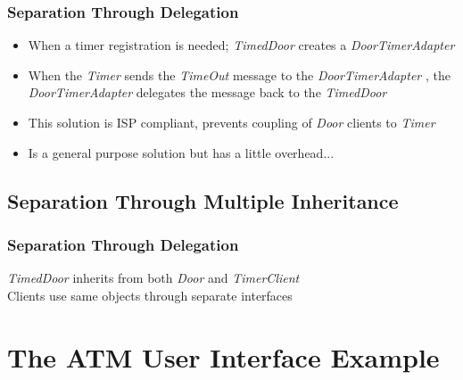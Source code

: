 \documentclass{beamer}
\begin{document}
\begin{frame}
  \frametitle{Separation Through Delegation}
  \begin{itemize}
	\item<+-> When a timer registration is needed; \textit{TimedDoor} creates a \textit{DoorTimerAdapter}
	\item<+-> When the \textit{Timer} sends the \textit{TimeOut} message to the \textit{DoorTimerAdapter} , the \textit{DoorTimerAdapter} delegates the message back to the \textit{TimedDoor}
	\item<+-> This solution is ISP compliant, prevents coupling of \textit{Door} clients to \textit{Timer}
	\item<+-> Is a general purpose solution but has a little overhead...
   \end{itemize}
\end{frame}

\subsection{Separation Through Multiple Inheritance}
\begin{frame}
  \frametitle{Separation Through Delegation}
  \textit{TimedDoor} inherits from both \textit{Door} and \textit{TimerClient} \\
  Clients use same objects through separate interfaces \\
  \begin{center}
  \end{center}
\end{frame}

\section{The ATM User Interface Example}
\end{document}
